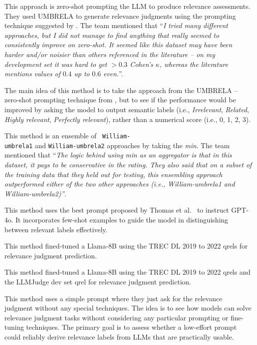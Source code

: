 This approach is zero-shot prompting the LLM to produce relevance assessments. They used UMBRELA \cite{upadhyay2024umbrela} to generate relevance judgments using the prompting technique suggested by \citet{thomas2023large}. The team mentioned that ``\textit{I tried many different approaches, but I did not manage to find anything that really seemed to consistently improve on zero-shot. It seemed like this dataset may have been harder and/or noisier than others referenced in the literature -- on my development set it was hard to get $> 0.3$ Cohen's $\kappa$, whereas the literature mentions values of $0.4$ up to $0.6$ even.}''.

The main idea of this method is to take the approach from the UMBRELA \cite{upadhyay2024umbrela} -- zero-shot prompting technique from \citet{thomas2023large}, but to see if the performance would be improved by asking the model to output semantic labels (i.e., \textit{Irrelevant}, \textit{Related}, \textit{Highly relevant}, \textit{Perfectly relevant}), rather than a numerical score (i.e., 0, 1, 2, 3).

This method is an ensemble of~ \texttt{William-\\umbrela1} and \texttt{William-umbrela2} approaches by taking the \textit{min}. The team mentioned that ``\textit{The logic behind using min as an aggregator is that in this dataset, it pays to be conservative in the rating. They also said that on a subset of the training data that they held out for testing, this ensembling approach outperformed either of the two other approaches (i.e., William-umbrela1 and William-umbrela2)''}.

This method uses the best prompt proposed by Thomas et al.~\cite{thomas2023large} to instruct GPT-4o. It incorporates few-shot examples to guide the model in distinguishing between relevant labels effectively.

This method fined-tuned a Llama-8B using the TREC DL 2019 to 2022 qrels for relevance judgment prediction.

This method fined-tuned a Llama-8B using the TREC DL 2019 to 2022 qrels and the LLMJudge dev set qrel for relevance judgment prediction.

This method uses a simple prompt where they just ask for the relevance judgment without any special techniques. The idea is to see how models can solve relevance judgment tasks without considering any particular prompting or fine-tuning techniques. The primary goal is to assess whether a low-effort prompt could reliably derive relevance labels from LLMs that are practically usable.

